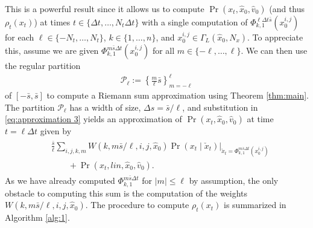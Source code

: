 \documentclass[letterpaper,10pt,conference]{ieeeconf}
\begin{document}
This is a powerful result since it allows us to compute $\Pr( x_t, \hat{x}_0, \hat{v}_0)$  (and thus $\rho_t(x_t)$) at times $t \in \{\Delta t, \dots, N_t \Delta t\}$ with a single computation of $\Phi_{k,1}^{\ell \Delta t \bar{s}}( x_0^{i,j})$ for each $\ell \in  \{-N_t,\dots,N_t\}$, $k \in \{1,\dots,n\}$, and $x_0^{i,j} \in \Gamma_L( \hat{x}_0 , N_x)$.
To appreciate this, assume we are given $\Phi_{k,1}^{m  \bar{s} \Delta t}(x_0^{i,j})$ for all $m \in \{ -\ell, \ldots, \ell \}$.
We can then use the regular partition
\begin{align}
	\mathcal{P}_\ell := \left\{ \frac{m}{\ell} \bar{s} \right\}_{m=-\ell}^{\ell} \label{eq:partition}
\end{align}
of $[-\bar{s}, \bar{s}]$ to compute a Riemann sum approximation using Theorem \ref{thm:main}.
The partition $\mathcal{P}_\ell$ has a width of size, $\Delta s = \bar{s} / \ell$, and substitution in \eqref{eq:approximation 3} yields an approximation of $\Pr( x_t, \hat{x}_0, \hat{v}_0)$ at time $t=\ell \Delta t$
given by
\begin{align*}
	\begin{split}
		&\frac{\bar{s}}{\ell} \sum_{i,j,k,m} W(k,m \bar{s} / \ell ,i,j,\hat{x}_0) \left. \Pr( x_t \mid \check{x}_t ) \right|_{ \check{x}_t = \Phi_{k,1}^{m \bar{s} \Delta t}( x_0^{i,j}) } \\
		&\qquad+\Pr( x_t , lin, \hat{x}_0, \hat{v}_0 ).
	\end{split}
\end{align*}
As we have already computed $\Phi_{k,1}^{m \bar{s} \Delta t}$ for $| m | \leq \ell$ by assumption, the only obstacle to computing this sum is the computation of the weights $W(k,m \bar{s} / \ell ,i,j,\hat{x}_0)$.
The procedure to compute  $\rho_t(x_t)$ is summarized in Algorithm \ref{alg:1}.
\end{document}
